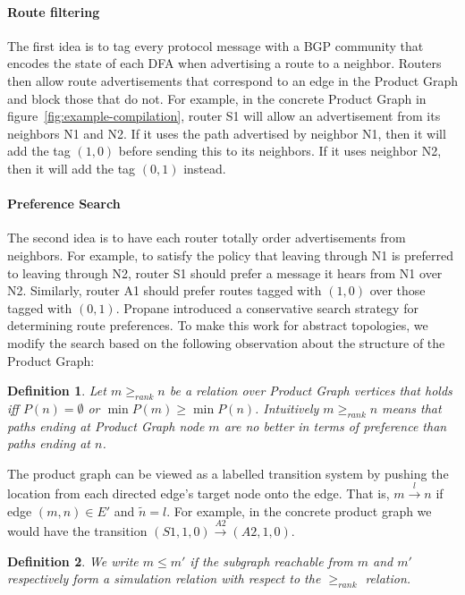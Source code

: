 \documentclass[numbers, 10pt, preprint]{sigplanconf}
\newcommand{\para}[1]{\paragraph*{\textbf{#1}}}
\newtheorem{defn}{Definition}
\begin{document}
\para{Route filtering}

The first idea is to tag every protocol message with a BGP community that encodes the state of each DFA when advertising a route to a neighbor. Routers then allow route advertisements that correspond to an edge in the Product Graph and block those that do not.
For example, in the concrete Product Graph in figure~\ref{fig:example-compilation}, router S1 will allow an advertisement from its neighbors N1 and N2. If it uses the path advertised by neighbor N1, then it will add the tag $(1,0)$ before sending this to its neighbors. If it uses neighbor N2, then it will add the tag $(0,1)$ instead.


\para{Preference Search}
The second idea is to have each router totally order advertisements from neighbors. For example, to satisfy the policy that leaving through N1 is preferred to leaving through N2, router S1 should prefer a message it hears from N1 over N2. Similarly, router A1 should prefer routes tagged with $(1,0)$ over those tagged with $(0,1)$.
Propane introduced a conservative search strategy for determining route preferences. To make this work for abstract topologies, we modify the search based on the following observation about the structure of the Product Graph:

\begin{defn}
Let $m \geq_{rank} n$ be a relation over Product Graph vertices that holds iff $P(n) = \emptyset$ or $\min P(m) \geq \min P(n)$. Intuitively $m \geq_{rank} n$ means that paths ending at Product Graph node $m$ are no better in terms of preference than paths ending at $n$.
%
\end{defn}
\noindent
%

The product graph can be viewed as a labelled transition system by pushing the location from each directed edge's target node onto the edge. That is, $m\overset{l}{\rightarrow}n$ if edge $(m,n) \in E'$ and $\tilde{n} = l$.
%
For example, in the concrete product graph we would have the transition $(S1,1,0)\overset{A2}{\rightarrow}(A2,1,0)$.

\begin{defn}
We write $m \leq m'$ if the subgraph reachable from $m$ and $m'$ respectively form a simulation relation with respect to the $\geq_{rank}$ relation.
\end{defn}
\end{document}
